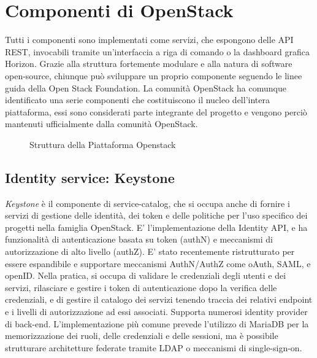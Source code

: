\section{Componenti di OpenStack}
Tutti i componenti sono implementati come servizi, che espongono delle API REST, invocabili tramite un'interfaccia a riga di comando o la dashboard grafica Horizon.
Grazie alla struttura fortemente modulare e alla natura di software open-source, chiunque può sviluppare un proprio componente seguendo le linee guida della Open Stack Foundation.\cite{GuidelinesOpenstackHacking}
La comunità  OpenStack ha comunque identificato una serie componenti che costituiscono il nucleo dell'intera piattaforma, essi sono considerati parte integrante del progetto e vengono perciò mantenuti ufficialmente dalla comunità OpenStack.
\begin{figure}[H]
\centering
{}
\caption{Struttura della Piattaforma Openstack\cite{openstacksoftware}}\label{openstacksw}
\end{figure}
\subsection{Identity service: Keystone}
\textit{Keystone} è il componente di service-catalog, che si occupa anche di fornire i servizi di gestione delle identità, dei token e delle politiche per l'uso specifico dei progetti nella famiglia OpenStack.
E' l'implementazione della Identity API, e ha funzionalità di autenticazione basata su token (authN) e meccanismi di autorizzazione di alto livello (authZ).
E' stato recentemente ristrutturato per essere espandibile e supportare meccanismi AuthN/AuthZ come oAuth, SAML, e openID.
Nella pratica, si occupa di validare le credenziali degli utenti e dei servizi, rilasciare e gestire i token di autenticazione dopo la verifica delle credenziali, e di gestire il catalogo dei servizi tenendo traccia dei relativi endpoint e i livelli di autorizzazione ad essi associati.
Supporta numerosi identity provider di back-end. L'implementazione più comune prevede l'utilizzo di MariaDB per la memorizzazione dei ruoli, delle credenziali e delle sessioni, ma è possibile strutturare architetture federate tramite LDAP o meccanismi di single-sign-on.

